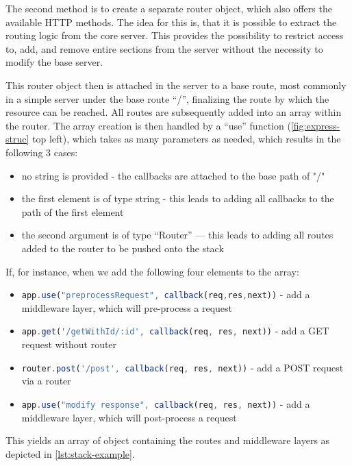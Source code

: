 The second method is to create a separate router object, which also offers the available HTTP methods. The idea for this is, that it is possible to extract the routing logic from the core server. This provides the possibility to restrict access to, add, and remove entire sections from the server without the necessity to modify the base server.

This router object then is attached in the server to a base route, most commonly in a simple server under the base route “/”, finalizing the route by which the resource can be reached. All routes are subsequently added into an array within the router. The array creation is then handled by a “use” function (\autoref{fig:express-struc} top left), which takes as many parameters as needed, which results in the following 3 cases:
\begin{itemize}
    \item  no string is provided - the callbacks are attached to the base path of "/"
     \item  the first element is of type string - this leads to adding all callbacks to the path of the first element
    \item  the second argument is of type “Router” — this leads to adding all routes added to the router to be pushed onto the stack
\end{itemize}
If, for instance, when we add the following four elements to the array:    
\begin{itemize}
    \item \lstinline[language=JavaScript]{app.use("preprocessRequest", callback(req,res,next))} - add a middleware layer, which will pre-process a request
    \item \lstinline[language=JavaScript]{app.get('/getWithId/:id', callback(req, res, next))} - add a GET request without router
    \item \lstinline[language=JavaScript]{router.post('/post', callback(req, res, next))} - add a POST request via a router
    \item \lstinline[language=JavaScript]{app.use("modify response", callback(req, res, next))} - add a middleware layer, which will post-process a request
\end{itemize}
This yields an array of object containing the routes and middleware layers as depicted in \autoref{lst:stack-example}.
